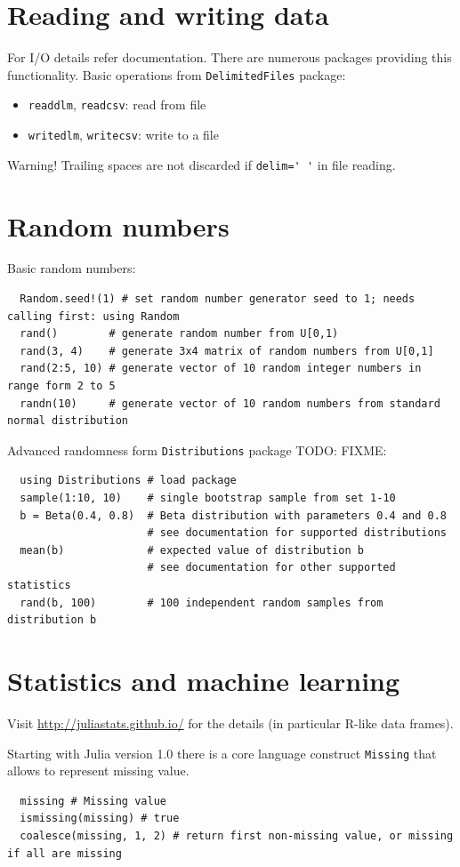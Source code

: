 \documentclass[10pt,a4paper]{article}
\begin{document}
\section{Reading and writing data}
For I/O details refer documentation. There are numerous packages providing this functionality.
Basic operations from \lstinline|DelimitedFiles| package:
\begin{itemize}
  \item \lstinline|readdlm|, \lstinline|readcsv|: read from file
  \item \lstinline|writedlm|, \lstinline|writecsv|: write to a file
\end{itemize}

Warning! Trailing spaces are not discarded if \lstinline|delim=' '| in file reading.

\section{Random numbers}
Basic random numbers:
\begin{lstlisting}
  Random.seed!(1) # set random number generator seed to 1; needs calling first: using Random
  rand()        # generate random number from U[0,1)
  rand(3, 4)    # generate 3x4 matrix of random numbers from U[0,1]
  rand(2:5, 10) # generate vector of 10 random integer numbers in range form 2 to 5
  randn(10)     # generate vector of 10 random numbers from standard normal distribution
\end{lstlisting}

Advanced randomness form \lstinline|Distributions| package TODO: FIXME:
\begin{lstlisting}
  using Distributions # load package
  sample(1:10, 10)    # single bootstrap sample from set 1-10
  b = Beta(0.4, 0.8)  # Beta distribution with parameters 0.4 and 0.8
                      # see documentation for supported distributions
  mean(b)             # expected value of distribution b
                      # see documentation for other supported statistics
  rand(b, 100)        # 100 independent random samples from distribution b
\end{lstlisting}

\section{Statistics and machine learning}
Visit \url{http://juliastats.github.io/} for the details (in particular R-like data frames).

Starting with Julia version 1.0 there is a core language construct \lstinline|Missing| that allows to represent missing value.
\begin{lstlisting}
  missing # Missing value
  ismissing(missing) # true
  coalesce(missing, 1, 2) # return first non-missing value, or missing if all are missing
\end{lstlisting}
\end{document}

